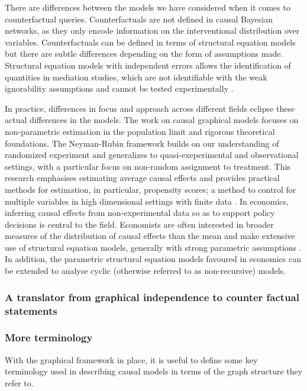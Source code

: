 \documentclass[11pt,a4paper,oneside]{book}
\begin{document}
There are differences between the models we have considered when it comes to counterfactual queries. Counterfactuals are not defined in causal Bayesian networks, as they only encode information on the interventional distribution over variables.  Counterfactuals can be defined in terms of structural equation models \cite{Pearl2000} but there are subtle differences depending on the form of assumptions made. Structural equation models with independent errors allows the identification of quantities in mediation studies, which are not identifiable with the weak ignorability assumptions and cannot be tested experimentally \cite{Richardson2013}.  

In practice, differences in focus and approach across different fields eclipse these actual differences in the models. The work on causal graphical models \cite{Pearl2000,Sprites} focuses on non-parametric estimation in the population limit and rigorous theoretical foundations. The Neyman-Rubin framework builds on our understanding of randomized experiment and generalizes to quasi-exeperimental and observational settings, with a particular focus on non-random assignment to treatment. This research emphasises estimating average causal effects and provides practical methods for estimation, in particular, propensity scores; a method to control for multiple variables in high dimensional settings with finite data \cite{Rosenbaum1983}. In economics, inferring causal effects from non-experimental data so as to support policy decisions is central to the field. Economists are often interested in broader measures of the distribution of causal effects than the mean and make extensive use of structural equation models, generally with strong parametric assumptions \cite{Heckman2008}. In addition, the parametric structural equation models favoured in economics can be extended to analyse cyclic (otherwise referred to as non-recursive) models. 


\subsubsection{A translator from graphical independence to counter factual statements}

\subsubsection*{More terminology}
With the graphical framework in place, it is useful to define some key terminology used in describing causal models in terms of the graph structure they refer to.
\end{document}
